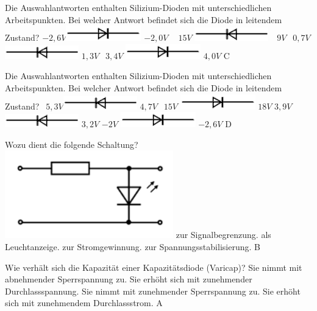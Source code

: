 {Die Auswahlantworten enthalten Silizium-Dioden mit unterschiedlichen Arbeitspunkten. Bei welcher Antwort befindet sich die Diode in leitendem Zustand?}%
{$-2,6V $\includegraphics[scale=0.5]{Diode/Bilder/Diode_r.png} $-2,0V$}%
{$~~~~15V$ \includegraphics[scale=0.5]{Diode/Bilder/Diode_l.png} $~~~9V$}%
{$~~0,7V$ \includegraphics[scale=0.5]{Diode/Bilder/Diode_l.png} $1,3V$}%
{$~~3,4V$ \includegraphics[scale=0.5]{Diode/Bilder/Diode_r.png} $4,0V$}%
{C}%

{Die Auswahlantworten enthalten Silizium-Dioden mit unterschiedlichen Arbeitspunkten. Bei welcher Antwort befindet sich die Diode in leitendem Zustand?}%
{$~~5,3V $\includegraphics[scale=0.5]{Diode/Bilder/Diode_l.png} $4,7V$}%
{$~~15V$ \includegraphics[scale=0.5]{Diode/Bilder/Diode_r.png} $18V$}%
{$3,9V$ \includegraphics[scale=0.5]{Diode/Bilder/Diode_l.png} $3,2V$}%
{$-2V$ \includegraphics[scale=0.5]{Diode/Bilder/Diode_r.png} $-2,6V$}%
{D}%

{Wozu dient die folgende Schaltung?\\ \includegraphics[scale=0.63]{Diode/Bilder/TC509.png}}%
{zur Signalbegrenzung.}%
{als Leuchtanzeige.}%
{zur Stromgewinnung.}%
{zur Spannungsstabilisierung.}%
{B}%

{Wie verhält sich die Kapazität einer Kapazitätsdiode (Varicap)?}%
{Sie nimmt mit abnehmender Sperrspannung zu.}%
{Sie erhöht sich mit zunehmender Durchlassspannung.}%
{Sie nimmt mit zunehmender Sperrspannung zu.}%
{Sie erhöht sich mit zunehmendem Durchlassstrom.}%
{A}%

